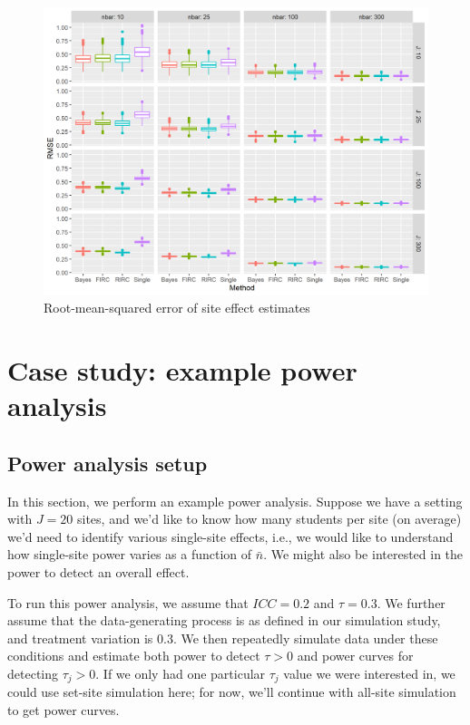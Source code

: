 \documentclass[]{article}
\begin{document}
\begin{figure}[ht]
	\centering
	\includegraphics[width=\textwidth]{rmse_plot}
	\caption{Root-mean-squared error of site effect estimates}
	\label{fig:rmse_plot}
\end{figure}

\section{Case study: example power analysis}

\subsection{Power analysis setup}

In this section, we perform an example power analysis.
Suppose we have a setting with $J=20$ sites, and we'd like to know how many students per site (on average) we'd need to identify various single-site effects, i.e., we would like to understand how single-site power varies as a function of $\bar{n}$.
We might also be interested in the power to detect an overall effect.

To run this power analysis, we assume that $ICC=0.2$ and $\tau=0.3$.
We further assume that the data-generating process is as defined in our simulation study, and treatment variation is 0.3.
We then repeatedly simulate data under these conditions and estimate both power to detect $\tau > 0$ and power curves for detecting $\tau_j > 0$.
If we only had one particular $\tau_j$ value we were interested in, we could use set-site simulation here; for now, we'll continue with all-site simulation to get power curves.
\end{document}
